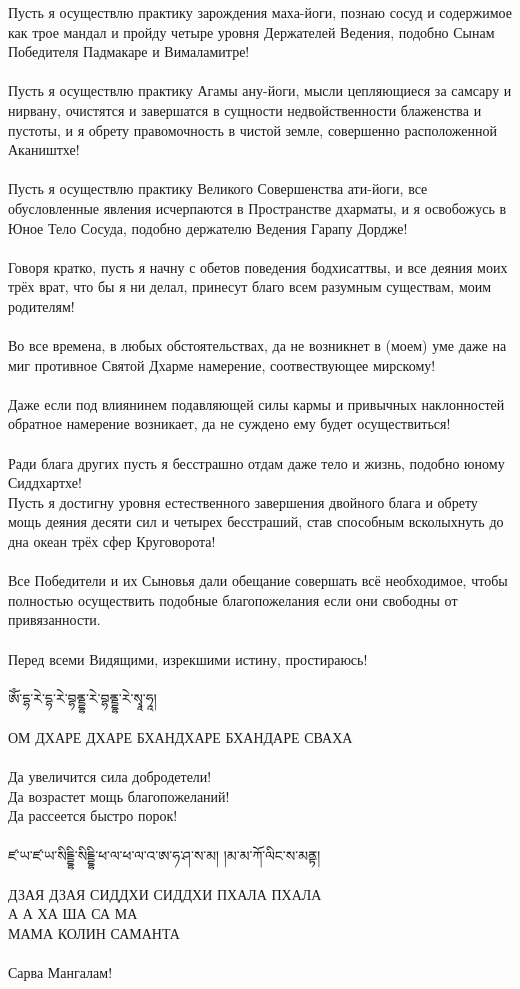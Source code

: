 Пусть я осуществлю практику зарождения маха-йоги,
познаю сосуд и содержимое как трое мандал и пройду четыре
уровня Держателей Ведения, подобно Сынам Победителя
Падмакаре и Вималамитре!\\
\\
Пусть я осуществлю практику Агамы ану-йоги, мысли
цепляю\-щиеся за самсару и нирвану, очистятся и завершатся
в сущности недвойственности блаженства и пустоты,
и я обрету правомочность в чистой земле,
совершенно расположенной Акаништхе!\\
\\
Пусть я осуществлю практику Великого Совершенства ати-йоги,
все обусловленные явления исчерпаются в Пространстве дхарматы,
и я освобожусь в Юное Тело Сосуда, подобно держателю
Ведения Гарапу Дордже!\\
\\
Говоря кратко, пусть я начну с обетов поведения бодхисаттвы,
и все деяния моих трёх врат, что бы я ни делал,
принесут благо всем разумным существам, моим родителям!\\
\\
Во все времена, в любых обстоятельствах, да не возникнет
в (моем) уме даже на миг противное Святой Дхарме намерение,
соотвествующее мирскому!\\
\\
Даже если под влиянинем подавляющей силы кармы и
привыч\-ных наклонностей обратное намерение возникает,
да не сужде\-но ему будет осуществиться!\\
\\
Ради блага других пусть я бесстрашно отдам даже тело и жизнь,
подобно юному Сиддхартхе!\\
\newpage
Пусть я достигну уровня естественного завершения двойного блага 
и обрету мощь деяния десяти сил и четырех бесстраший,
став способным всколыхнуть до дна океан трёх сфер Кругово\-рота!\\
\\
Все Победители и их Сыновья дали обещание совершать всё
необходимое, чтобы полностью осуществить подобные благопожелания
если они свободны от привязанности.\\
\\
Перед всеми Видящими, изрекшими истину, простираюсь!
\\
\\
\ti
ཨོཾ་དྷ་རེ་དྷ་རེ་བྷནྡྷ་རེ་བྷནྡྷ་རེ་སྭཱ་ཧཱ། \\
\\
\ru
ОМ ДХАРЕ ДХАРЕ БХАНДХАРЕ БХАНДАРЕ СВАХА\\
\\
\noindent
Да увеличится сила добродетели!\\
Да возрастет мощь благопожеланий!\\
Да рассеется быстро порок!\\
\\
\ti ཛ་ཡ་ཛ་ཡ་སིདྡྷི་སིདྡྷི་ཕ་ལ་ཕ་ལ་འ་ཨ་ཧ་ཤ་ས་མ། །མ་མ་ཀོ་ལིང་ས་མནྟ། \\
\\
\ru ДЗАЯ ДЗАЯ СИДДХИ СИДДХИ ПХАЛА ПХАЛА\\
А А ХА ША СА МА\\
МАМА КОЛИН САМАНТА\\
\\
\scriptsize
\ru Сарва Мангалам!
\normalsize
